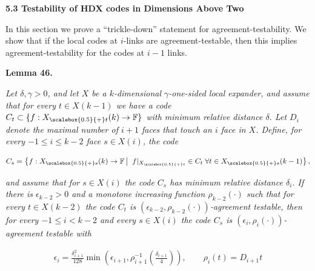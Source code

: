 \par\medskip\noindent\textbf{
5.3 Testability of HDX codes in Dimensions Above Two}\par




In this section we prove a “trickle-down” statement for agreement-testability. We show that if the local codes at $i$-links are agreement-testable, then this implies agreement-testability for the codes at $i-1$ links.\par





\par\medskip\noindent\textbf{
\textbf{Lemma 46}\textbf{.}
}\par



\emph{Let $\delta,\gamma>0$, and let $X$ be a $k$-dimensional $\gamma$-one-sided local expander, and assume that for every $t\in X(k-1)$ we have a code $C_{t}\subset\{f:{X}_{\scalebox{0.5}{+}t}(k)\to\mathbb{F}\}$ with minimum relative distance $\delta$. Let $D_{i}$ denote the maximal number of $i+1$ faces that touch an $i$ face in $X$.
Define, for every $-1\leq i\leq k-2$ face $s\in X(i)$, the code}\par


\[\begin{gathered}
C_{s}=\left\{f:{X}_{\scalebox{0.5}{+}s}(k)\to\mathbb{F}\left|\;\vphantom{f:{X}_{\scalebox{0.5}{+}s}(k)\to\mathbb{F}f|_{{X}_{\scalebox{0.5}{+}t}}\in C_{t}\;\forall t\in{X}_{\scalebox{0.5}{+}s}(k-1)}\right.f|_{{X}_{\scalebox{0.5}{+}t}}\in C_{t}\;\forall t\in{X}_{\scalebox{0.5}{+}s}(k-1)\right\},
\end{gathered}\]


\emph{and assume that for $s\in X(i)$ the code $C_{s}$ has minimum relative distance $\delta_{i}$.
If there is $\epsilon_{k-2}>0$ and a monotone increasing function $\rho_{k-2}(\cdot)$ such that for every $t\in X(k-2)$ the code $C_{t}$ is $(\epsilon_{k-2},\rho_{k-2}(\cdot))$-agreement testable, then for every $-1\leq i<k-2$ and every $s\in X(i)$ the code $C_{s}$ is $(\epsilon_{i},\rho_{i}(\cdot))$-agreement testable with}\par


\[\begin{gathered}
\epsilon_{i}=\frac{\delta_{i+1}^{2}}{128}\min\left(\epsilon_{i+1},\rho_{i+1}^{-1}\left(\frac{\delta_{i+1}}{4}\right)\right),\qquad\rho_{i}(t)=D_{i+1}t
\end{gathered}\]


